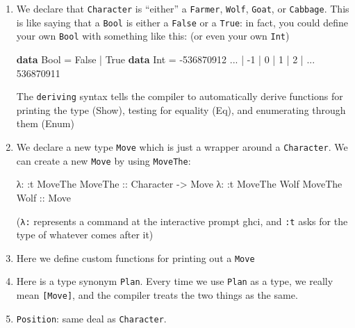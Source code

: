 \documentclass[]{article}
\newenvironment{Shaded}{}{}
\newcommand{\KeywordTok}[1]{\textcolor[rgb]{0.00,0.44,0.13}{\textbf{{#1}}}}
\newcommand{\DataTypeTok}[1]{\textcolor[rgb]{0.56,0.13,0.00}{{#1}}}
\newcommand{\DecValTok}[1]{\textcolor[rgb]{0.25,0.63,0.44}{{#1}}}
\newcommand{\OtherTok}[1]{\textcolor[rgb]{0.00,0.44,0.13}{{#1}}}
\newcommand{\FunctionTok}[1]{\textcolor[rgb]{0.02,0.16,0.49}{{#1}}}
\newcommand{\NormalTok}[1]{{#1}}
\begin{document}
\begin{enumerate}
\def\labelenumi{\arabic{enumi}.}
\item
  We declare that \texttt{Character} is ``either'' a \texttt{Farmer},
  \texttt{Wolf}, \texttt{Goat}, or \texttt{Cabbage}. This is like saying that a
  \texttt{Bool} is either a \texttt{False} or a \texttt{True}: in fact, you
  could define your own \texttt{Bool} with something like this: (or even your
  own \texttt{Int})

\begin{Shaded}
\begin{Highlighting}[]
\KeywordTok{data} \DataTypeTok{Bool} \FunctionTok{=} \DataTypeTok{False} \FunctionTok{|} \DataTypeTok{True}
\KeywordTok{data} \DataTypeTok{Int} \FunctionTok{=} \FunctionTok{-}\DecValTok{536870912} \FunctionTok{...} \FunctionTok{|} \FunctionTok{-}\DecValTok{1} \FunctionTok{|} \DecValTok{0} \FunctionTok{|} \DecValTok{1} \FunctionTok{|} \DecValTok{2} \FunctionTok{|} \FunctionTok{...} \DecValTok{536870911}
\end{Highlighting}
\end{Shaded}

  The \texttt{deriving} syntax tells the compiler to automatically derive
  functions for printing the type (Show), testing for equality (Eq), and
  enumerating through them (Enum)
\item
  We declare a new type \texttt{Move} which is just a wrapper around a
  \texttt{Character}. We can create a new \texttt{Move} by using
  \texttt{MoveThe}:

\begin{Shaded}
\begin{Highlighting}[]
\NormalTok{λ}\FunctionTok{:} \FunctionTok{:}\NormalTok{t }\DataTypeTok{MoveThe}
\DataTypeTok{MoveThe}\OtherTok{ ::} \DataTypeTok{Character} \OtherTok{->} \DataTypeTok{Move}
\NormalTok{λ}\FunctionTok{:} \FunctionTok{:}\NormalTok{t }\DataTypeTok{MoveThe} \DataTypeTok{Wolf}
\DataTypeTok{MoveThe} \DataTypeTok{Wolf}\OtherTok{ ::} \DataTypeTok{Move}
\end{Highlighting}
\end{Shaded}

  (\texttt{λ:} represents a command at the interactive prompt ghci, and
  \texttt{:t} asks for the type of whatever comes after it)
\item
  Here we define custom functions for printing out a \texttt{Move}
\item
  Here is a type synonym \texttt{Plan}. Every time we use \texttt{Plan} as a
  type, we really mean \texttt{{[}Move{]}}, and the compiler treats the two
  things as the same.
\item
  \texttt{Position}: same deal as \texttt{Character}.
\end{enumerate}
\end{document}
